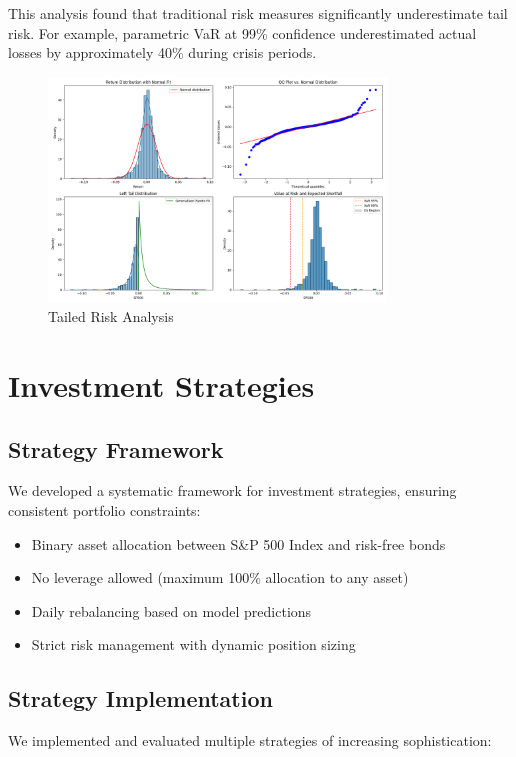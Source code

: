 \documentclass[10pt]{article}
\begin{document}
This analysis found that traditional risk measures significantly underestimate tail risk. For example, parametric VaR at 99\% confidence underestimated actual losses by approximately 40\% during crisis periods.
\begin{figure}[htbp]
	\centering
	\includegraphics[width=0.8\textwidth]{../results/catastrophe/tail_risk_analysis.png}
	\caption{Tailed Risk Analysis}
	\label{fig:tailed_risk}
\end{figure}

\section{Investment Strategies}
\subsection{Strategy Framework}
We developed a systematic framework for investment strategies, ensuring consistent portfolio constraints:

\begin{itemize}
	\item Binary asset allocation between S\&P 500 Index and risk-free bonds
	\item No leverage allowed (maximum 100\% allocation to any asset)
	\item Daily rebalancing based on model predictions
	\item Strict risk management with dynamic position sizing
\end{itemize}

\subsection{Strategy Implementation}
We implemented and evaluated multiple strategies of increasing sophistication:
\end{document}
